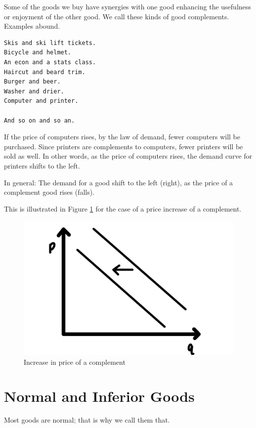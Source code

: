 \documentclass[
]{book}
\begin{document}
Some of the goods we buy have synergies with one good enhancing the usefulness or enjoyment of the other good. We call these kinds of good complements. Examples abound.

\begin{verbatim}
Skis and ski lift tickets.
Bicycle and helmet.
An econ and a stats class.
Haircut and beard trim.
Burger and beer.
Washer and drier.
Computer and printer.

And so on and so an.
\end{verbatim}

If the price of computers rises, by the law of demand, fewer computers will be purchased. Since printers are complements to computers, fewer printers will be sold as well. In other words, as the price of computers rises, the demand curve for printers shifts to the left.

In general: The demand for a good shift to the left (right), as the price of a complement good rises (falls).

This is illustrated in Figure \ref{fig:fig308} for the case of a price increase of a complement.

\begin{figure}

{\centering \includegraphics[width=0.75\linewidth]{img/ch3/fig8} 

}

\caption{Increase in price of a complement}\label{fig:fig308}
\end{figure}

\hypertarget{normal-and-inferior-goods}{%
\section{Normal and Inferior Goods}\label{normal-and-inferior-goods}}

Most goods are normal; that is why we call them that.
\end{document}
